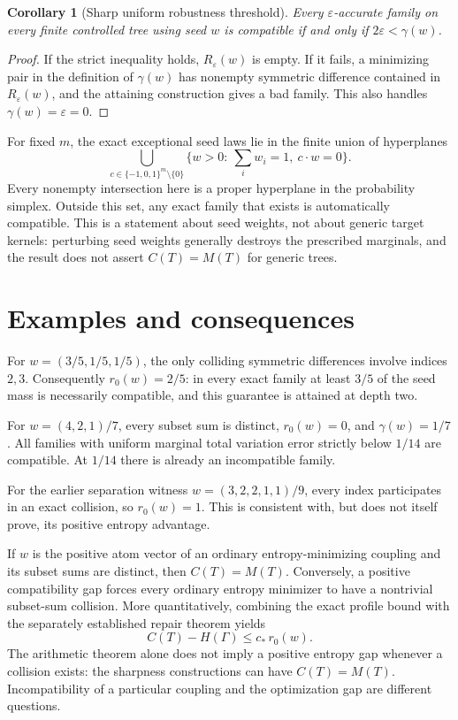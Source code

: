 \documentclass[11pt]{article}
\newtheorem{corollary}[theorem]{Corollary}
\begin{document}
\begin{corollary}[Sharp uniform robustness threshold]
Every $\varepsilon$-accurate family on every finite controlled tree using seed $w$ is compatible if and only if $2\varepsilon<\gamma(w)$.
\end{corollary}
\begin{proof}
If the strict inequality holds, $R_\varepsilon(w)$ is empty. If it fails, a minimizing pair in the definition of $\gamma(w)$ has nonempty symmetric difference contained in $R_\varepsilon(w)$, and the attaining construction gives a bad family. This also handles $\gamma(w)=\varepsilon=0$.
\end{proof}

For fixed $m$, the exact exceptional seed laws lie in the finite union of hyperplanes
\[
 \bigcup_{c\in\{-1,0,1\}^m\setminus\{0\}}
 \{w>0:\ \sum_iw_i=1,\ c\cdot w=0\}.
\]
Every nonempty intersection here is a proper hyperplane in the probability simplex. Outside this set, any exact family that exists is automatically compatible. This is a statement about seed weights, not about generic target kernels: perturbing seed weights generally destroys the prescribed marginals, and the result does not assert $C(T)=M(T)$ for generic trees.

\section{Examples and consequences}
For $w=(3/5,1/5,1/5)$, the only colliding symmetric differences involve indices $2,3$. Consequently $r_0(w)=2/5$: in every exact family at least $3/5$ of the seed mass is necessarily compatible, and this guarantee is attained at depth two.

For $w=(4,2,1)/7$, every subset sum is distinct, $r_0(w)=0$, and $\gamma(w)=1/7$. All families with uniform marginal total variation error strictly below $1/14$ are compatible. At $1/14$ there is already an incompatible family.

For the earlier separation witness $w=(3,2,2,1,1)/9$, every index participates in an exact collision, so $r_0(w)=1$. This is consistent with, but does not itself prove, its positive entropy advantage.

If $w$ is the positive atom vector of an ordinary entropy-minimizing coupling and its subset sums are distinct, then $C(T)=M(T)$. Conversely, a positive compatibility gap forces every ordinary entropy minimizer to have a nontrivial subset-sum collision. More quantitatively, combining the exact profile bound with the separately established repair theorem yields
\[
 C(T)-H(\Gamma)\le c_*\,r_0(w).
\]
The arithmetic theorem alone does not imply a positive entropy gap whenever a collision exists: the sharpness constructions can have $C(T)=M(T)$. Incompatibility of a particular coupling and the optimization gap are different questions.
\end{document}
